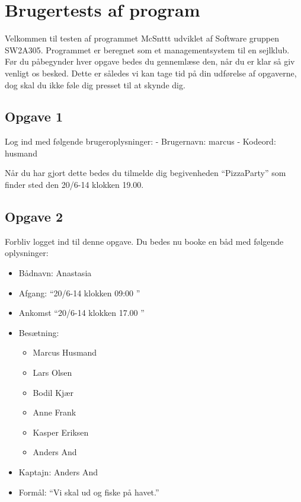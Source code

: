 \chapter{Brugertests af program}\label{BrugerTestCases}


Velkommen til testen af programmet McSnttt udviklet af Software gruppen SW2A305.
Programmet er beregnet som et managementsystem til en sejlklub.
Før du påbegynder hver opgave bedes du gennemlæse den, når du er klar så giv venligt os besked.
Dette er således vi kan tage tid på din udførelse af opgaverne, dog skal du ikke føle dig presset til at skynde dig.

\section{Opgave 1}

Log ind med følgende brugeroplysninger: 
\newline - Brugernavn: marcus
\newline - Kodeord: husmand

Når du har gjort dette bedes du tilmelde dig begivenheden ``PizzaParty'' som finder sted den 20/6-14 klokken 19.00.

\section{Opgave 2}

Forbliv logget ind til denne opgave. Du bedes nu booke en båd med følgende oplysninger:

\begin{itemize}
	\item Bådnavn: Anastasia
	\item Afgang: ``20/6-14 klokken 09:00 ''
	\item Ankomst ``20/6-14 klokken 17.00 ''
	\item Besætning: 
	\begin{itemize}
		\item Marcus Husmand
		\item Lars Olsen
		\item Bodil Kjær
		\item Anne Frank
		\item Kasper Eriksen
		\item Anders And
	\end{itemize}
	\item Kaptajn: Anders And
	\item Formål: ``Vi skal ud og fiske på havet.''

\end{itemize}

